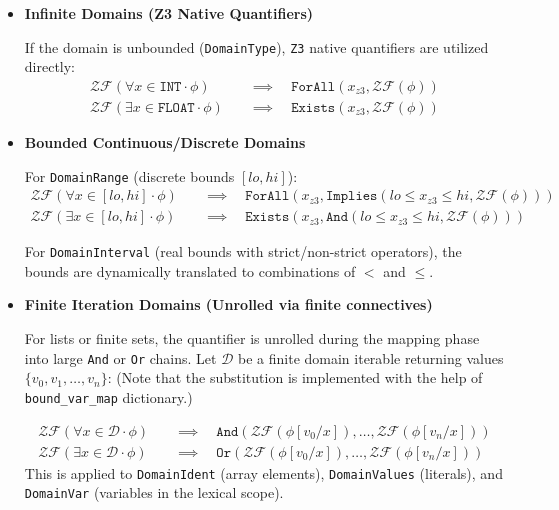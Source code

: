 \documentclass{article}
\begin{document}
\begin{itemize}
    \item \textbf{Infinite Domains (Z3 Native Quantifiers)}
    
    If the domain is unbounded (\texttt{DomainType}), \texttt{Z3} native quantifiers are utilized directly:
    \[
    \begin{aligned}
    \mathcal{ZF}(\forall x \in \texttt{INT} \cdot \phi) \quad &\implies \quad \texttt{ForAll}(x_{z3}, \mathcal{ZF}(\phi)) \\
    \mathcal{ZF}(\exists x \in \texttt{FLOAT} \cdot \phi) \quad &\implies \quad \texttt{Exists}(x_{z3}, \mathcal{ZF}(\phi))
    \end{aligned}
    \]
    
    \item \textbf{Bounded Continuous/Discrete Domains}
    
    For \texttt{DomainRange} (discrete bounds $[lo, hi]$):
    \[
    \begin{aligned}
    \mathcal{ZF}(\forall x \in [lo, hi] \cdot \phi) \quad &\implies \quad \texttt{ForAll}(x_{z3}, \texttt{Implies}(lo \le x_{z3} \le hi, \mathcal{ZF}(\phi))) \\
    \mathcal{ZF}(\exists x \in [lo, hi] \cdot \phi) \quad &\implies \quad \texttt{Exists}(x_{z3}, \texttt{And}(lo \le x_{z3} \le hi, \mathcal{ZF}(\phi)))
    \end{aligned}
    \]

    For \texttt{DomainInterval} (real bounds with strict/non-strict operators), the bounds are dynamically translated to combinations of $<$ and $\le$.
    
    \item \textbf{Finite Iteration Domains (Unrolled via finite connectives)}
    
    For lists or finite sets, the quantifier is unrolled during the mapping phase into large \texttt{And} or \texttt{Or} chains. Let $\mathcal{D}$ be a finite domain iterable returning values $\{v_0, v_1, \dots, v_n\}$: (Note that the substitution is implemented with the help of \texttt{bound\_var\_map} dictionary.)
    
    \[
    \begin{aligned}
    \mathcal{ZF}(\forall x \in \mathcal{D} \cdot \phi) \quad &\implies \quad \texttt{And}( \mathcal{ZF}(\phi[v_0/x]), \dots, \mathcal{ZF}(\phi[v_n/x]) ) \\
    \mathcal{ZF}(\exists x \in \mathcal{D} \cdot \phi) \quad &\implies \quad \texttt{Or}( \mathcal{ZF}(\phi[v_0/x]), \dots, \mathcal{ZF}(\phi[v_n/x]) )
    \end{aligned}
    \]
    This is applied to \texttt{DomainIdent} (array elements), \texttt{DomainValues} (literals), and \texttt{DomainVar} (variables in the lexical scope).
    
\end{itemize}
\end{document}
